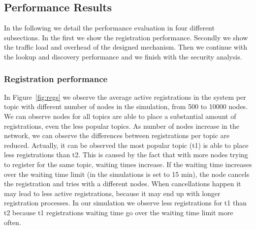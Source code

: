%



\iffalse
\subsection{Performance Results}

In the following we detail the performance evaluation in four different subsections.  In the first we show the registration performance.  Secondly we show the traffic load and overhead of the designed mechanism.  Then we continue with the lookup and discovery performance and we finish with the security analysis.

\subsubsection{Registration  performance}

In Figure~\ref{fig:regs} we observe the average active registrations in the system per topic with different number of nodes in the simulation,  from 500 to 10000 nodes. 
We can observe nodes for all topics are able to place a substantial amount of registrations, even the less popular topics. 
As number of nodes increase in the network, we can observe the differences between registrations per topic are reduced. 
Actually, it can be observed the most popular topic (t1) is able to place less registrations than t2. 
This is caused by the fact that with more nodes trying to register for the same topic,  waiting times increase.
If the waiting time increases over the waiting time limit (in the simulations is set to 15 min),  the node cancels the registration and tries with a different nodes.
When cancellations happen it may lead to less active registrations, because it may end up with longer registration processes.
In our simulation we observe less registrations for t1 than t2  because t1 registrations waiting time go over the waiting time limit more often.


